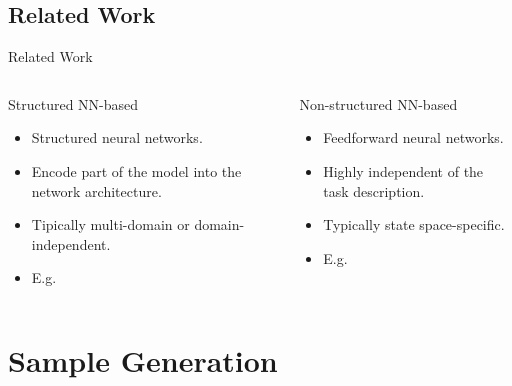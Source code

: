 \documentclass[10pt]{beamer}
\begin{document}
\subsection{Related Work}

\begin{frame}{Related Work}
\begin{columns}
    \begin{column}{0.5\textwidth}
        Structured NN-based
        \newline
        \begin{itemize}
            \item Structured neural networks.
            \item Encode part of the model into the network architecture.
            \item Tipically multi-domain or domain-independent.
            \item E.g. \citet{shen2020learning}
        \end{itemize}
    \end{column}
    \begin{column}{0.5\textwidth}
        Non-structured NN-based
        \newline
        \begin{itemize}
            \item Feedforward neural networks.
            \item Highly independent of the task description. 
            \item Typically state space-specific.
            \item E.g. \citet{otoole2022sampling}
            \newline
        \end{itemize}
    \end{column}
\end{columns}
\end{frame}

\section{Sample Generation}
\end{document}
